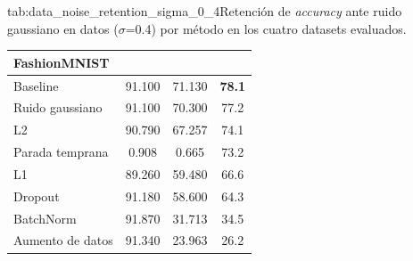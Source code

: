 \begin{table}{tab:data_noise_retention_sigma_0_4}{Retención de \textit{accuracy} ante ruido gaussiano en datos ($\sigma$=0.4) por método en los cuatro datasets evaluados.}
\begin{tabular}{lccc}
\midrule
\multicolumn{4}{l}{\textbf{FashionMNIST}}\\
\midrule
Baseline & 91.100 & 71.130 & \textbf{78.1} \\
Ruido gaussiano & 91.100 & 70.300 & 77.2 \\
L2 & 90.790 & 67.257 & 74.1 \\
Parada temprana & 0.908 & 0.665 & 73.2 \\
L1 & 89.260 & 59.480 & 66.6 \\
Dropout & 91.180 & 58.600 & 64.3 \\
BatchNorm & 91.870 & 31.713 & 34.5 \\
Aumento de datos & 91.340 & 23.963 & 26.2 \\
\bottomrule
\end{tabular}
\end{table}